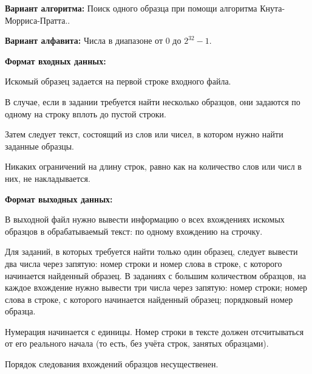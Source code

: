 

{\bfseries Вариант алгоритма:} Поиск одного образца при помощи алгоритма Кнута-Морриса-Пратта..

{\bfseries Вариант алфавита:} { \normalfont\ttfamily Числа в диапазоне от $0$ до $2^{32} - 1$. }

{\bfseries Формат входных данных:}
{ \normalfont\ttfamily Искомый образец задается на первой строке входного файла.

В случае, если в задании требуется найти несколько образцов, они задаются по одному на строку вплоть до пустой строки.

Затем следует текст, состоящий из слов или чисел, в котором нужно найти заданные образцы.

Никаких ограничений на длину строк, равно как на количество слов или числ в них, не накладывается.}

{\bfseries Формат выходных данных:}
{ \normalfont\ttfamily В выходной файл нужно вывести информацию о всех вхождениях искомых образцов в обрабатываемый текст: по одному вхождению на строчку.

Для заданий, в которых требуется найти только один образец, следует вывести два числа через запятую: номер строки и номер слова в строке, с которого начинается найденный образец. В заданиях с большим количеством образцов, на каждое вхождение нужно вывести три числа через запятую: номер строки; номер слова в строке, с которого начинается найденный образец; порядковый номер образца.

Нумерация начинается с единицы. Номер строки в тексте должен отсчитываться от его реального начала (то есть, без учёта строк, занятых образцами).

Порядок следования вхождений образцов несущественен.}
\pagebreak